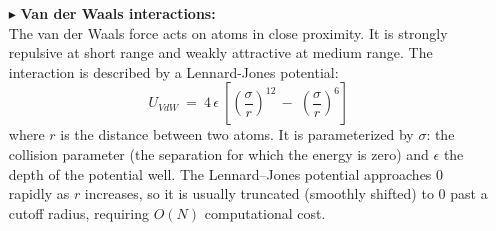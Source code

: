 \begin{itemize}
\item[$\blacktriangleright$] \textbf{Van der Waals interactions:}\\
The van der Waals force acts on atoms in close proximity. It is strongly repulsive at short range and weakly attractive at medium range. The interaction is described by a Lennard-Jones potential:
\begin{equation}\label{eq:LJpotential}
U_{VdW} \: = \: 4 \, \epsilon \: \left[ \left(\frac{\sigma}{r}\right)^{12} \,-\; \left(\frac{\sigma}{r}\right)^6 \right]
\end{equation}
where $r$ is the distance between two atoms. It is parameterized by $\sigma$: the collision parameter (the separation for which the energy is zero) and $\epsilon$ the depth of the potential well.
 The Lennard–Jones potential approaches 0 rapidly as $r$ increases, so it is usually truncated (smoothly shifted) to 0 past a cutoff radius, requiring $O(N)$ computational cost.%


\end{itemize}
